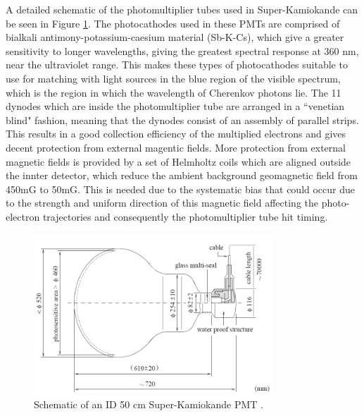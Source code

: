 A detailed schematic of the photomultiplier tubes used in Super-Kamiokande can be seen in Figure \ref{fig:PMTdiagram}. The photocathodes used in these PMTs are comprised of bialkali antimony-potassium-caesium material (Sb-K-Cs), which give a greater sensitivity to longer wavelengths, giving the greatest spectral response at 360 nm, near the ultraviolet range. This makes these types of photocathodes suitable to use for matching with light sources in the blue region of the visible spectrum, which is the region in which the wavelength of Cherenkov photons lie. The 11 dynodes which are inside the photomultiplier tube are arranged in a ``venetian blind" fashion, meaning that the dynodes consist of an assembly of parallel strips. This results in a good collection efficiency of the multiplied electrons and gives decent protection from external magentic fields. More protection from external magnetic fields is provided by a set of Helmholtz coils which are aligned outside the innter detector, which reduce the ambient background geomagnetic field from 450mG to 50mG. This is needed due to the systematic bias that could occur due to the strength and uniform direction of this magnetic field affecting the photo-electron trajectories and consequently the photomultiplier tube hit timing. 

\begin{figure}
    \centering
    \includegraphics[width=0.8\textwidth]{Figures/PMT_schematic.png}
\caption{Schematic of an ID 50 cm Super-Kamiokande PMT \cite{fukuda_super-kamiokande_2003}.}
    \label{fig:PMTdiagram}
\end{figure}


